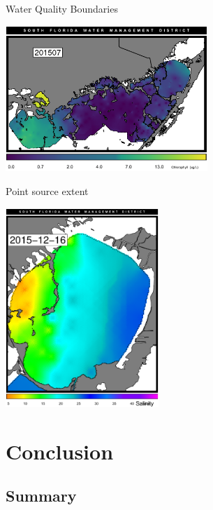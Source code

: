 \documentclass[compress,noflama,nosectionpages]{beamer}
\begin{document}
		\begin{frame}{Water Quality Boundaries}
			\begin{center}
				\includegraphics[height=5.5cm,keepaspectratio=true,trim= 1mm 0mm 1mm 10mm,clip=TRUE]{figures/201507_chl.png}\\
			\end{center}
		\end{frame}
		
		\begin{frame}{Point source extent}
			\begin{center}
				\includegraphics[height=7.5cm,keepaspectratio=true,trim= 1mm 0mm 1mm 10mm,clip=TRUE]{figures/201513_chl_biglegend.png}\\
			\end{center}
		\end{frame}
		

\section{Conclusion}
\subsection{Summary}
\end{document}
